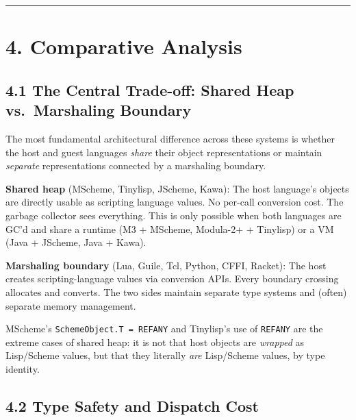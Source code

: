 \documentclass[
  12pt,
]{report}
\newcommand{\passthrough}[1]{#1}
\begin{document}
\begin{center}\rule{0.5\linewidth}{0.5pt}\end{center}

\section{4. Comparative Analysis}\label{comparative-analysis}

\subsection{4.1 The Central Trade-off: Shared Heap vs.~Marshaling
Boundary}\label{the-central-trade-off-shared-heap-vs.-marshaling-boundary}

The most fundamental architectural difference across these systems is
whether the host and guest languages \emph{share} their object
representations or maintain \emph{separate} representations connected by
a marshaling boundary.

\textbf{Shared heap} (MScheme, Tinylisp, JScheme, Kawa): The host
language's objects are directly usable as scripting language values. No
per-call conversion cost. The garbage collector sees everything. This is
only possible when both languages are GC'd and share a runtime (M3 +
MScheme, Modula-2+ + Tinylisp) or a VM (Java + JScheme, Java + Kawa).

\textbf{Marshaling boundary} (Lua, Guile, Tcl, Python, CFFI, Racket):
The host creates scripting-language values via conversion APIs. Every
boundary crossing allocates and converts. The two sides maintain
separate type systems and (often) separate memory management.

MScheme's \passthrough{\lstinline!SchemeObject.T = REFANY!} and
Tinylisp's use of \passthrough{\lstinline!REFANY!} are the extreme cases
of shared heap: it is not that host objects are \emph{wrapped} as
Lisp/Scheme values, but that they literally \emph{are} Lisp/Scheme
values, by type identity.

\subsection{4.2 Type Safety and Dispatch
Cost}\label{type-safety-and-dispatch-cost}
\end{document}
